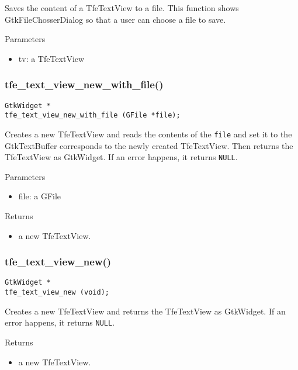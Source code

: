 Saves the content of a TfeTextView to a file. This function shows
GtkFileChosserDialog so that a user can choose a file to save.

Parameters

\begin{itemize}
\tightlist
\item
  tv: a TfeTextView
\end{itemize}

\hypertarget{tfe_text_view_new_with_file}{%
\subsubsection{tfe\_text\_view\_new\_with\_file()}\label{tfe_text_view_new_with_file}}

\begin{lstlisting}
GtkWidget *
tfe_text_view_new_with_file (GFile *file);
\end{lstlisting}

Creates a new TfeTextView and reads the contents of the
\passthrough{\lstinline!file!} and set it to the GtkTextBuffer
corresponds to the newly created TfeTextView. Then returns the
TfeTextView as GtkWidget. If an error happens, it returns
\passthrough{\lstinline!NULL!}.

Parameters

\begin{itemize}
\tightlist
\item
  file: a GFile
\end{itemize}

Returns

\begin{itemize}
\tightlist
\item
  a new TfeTextView.
\end{itemize}

\hypertarget{tfe_text_view_new}{%
\subsubsection{tfe\_text\_view\_new()}\label{tfe_text_view_new}}

\begin{lstlisting}
GtkWidget *
tfe_text_view_new (void);
\end{lstlisting}

Creates a new TfeTextView and returns the TfeTextView as GtkWidget. If
an error happens, it returns \passthrough{\lstinline!NULL!}.

Returns

\begin{itemize}
\tightlist
\item
  a new TfeTextView.
\end{itemize}

